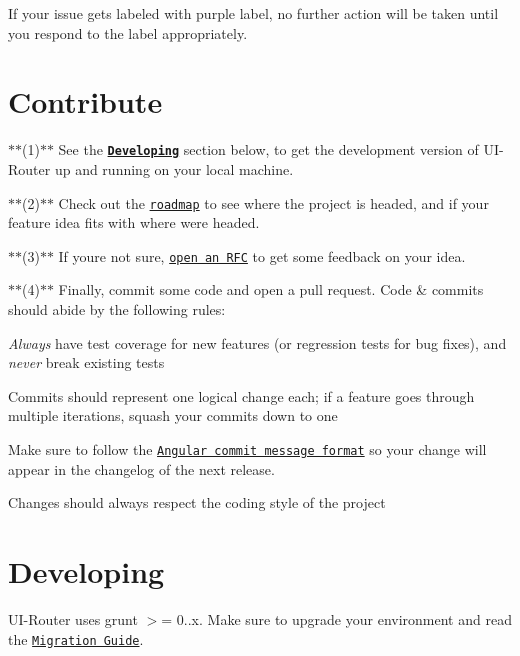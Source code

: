 If your issue gets labeled with purple label, no further action will be taken until you respond to the label appropriately.

\section*{Contribute}

$\ast$$\ast$(1)$\ast$$\ast$ See the {\bfseries \href{#developing}{\tt Developing}} section below, to get the development version of U\+I-\/\+Router up and running on your local machine.

$\ast$$\ast$(2)$\ast$$\ast$ Check out the \href{https://github.com/angular-ui/ui-router/milestones}{\tt roadmap} to see where the project is headed, and if your feature idea fits with where we\textquotesingle{}re headed.

$\ast$$\ast$(3)$\ast$$\ast$ If you\textquotesingle{}re not sure, \href{https://github.com/angular-ui/ui-router/issues/new?title=RFC:%20My%20idea}{\tt open an R\+FC} to get some feedback on your idea.

$\ast$$\ast$(4)$\ast$$\ast$ Finally, commit some code and open a pull request. Code \& commits should abide by the following rules\+:


\begin{DoxyItemize}
\item {\itshape Always} have test coverage for new features (or regression tests for bug fixes), and {\itshape never} break existing tests
\item Commits should represent one logical change each; if a feature goes through multiple iterations, squash your commits down to one
\item Make sure to follow the \href{https://github.com/angular/angular.js/blob/master/CONTRIBUTING.md#commit-message-format}{\tt Angular commit message format} so your change will appear in the changelog of the next release.
\item Changes should always respect the coding style of the project
\end{DoxyItemize}

\section*{Developing}

U\+I-\/\+Router uses {\ttfamily grunt $>$= 0..\+x}. Make sure to upgrade your environment and read the \href{http://gruntjs.com/upgrading-from-0.3-to-0.4}{\tt Migration Guide}.

